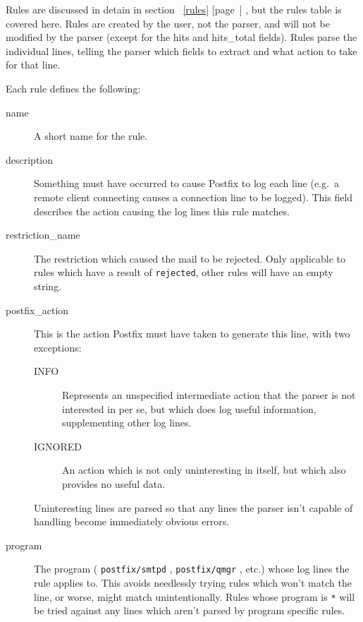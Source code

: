 \documentclass[a4paper,12pt,draft]{article}
\newcommand{\refwithpage}[1]{%
    \empty{}\ref{#1} [page~\pageref{#1}]%
}
\newcommand{\daemon}[1]{%
    \texttt{postfix/#1}%
}
\begin{document}
Rules are discussed in detain in section~\refwithpage{rules}, but the rules
table is covered here.  Rules are created by the user, not the parser, and
will not be modified by the parser (except for the hits and hits\_total
fields).  Rules parse the individual lines, telling the parser which fields
to extract and what action to take for that line.

Each rule defines the following:

\begin{description}

    \item [name] A short name for the rule.

    \item [description] Something must have occurred to cause Postfix to
        log each line (e.g.\ a remote client connecting causes a connection
        line to be logged).  This field describes the action causing the
        log lines this rule matches.

    \item [restriction\_name] The restriction which caused the mail to be
        rejected.  Only applicable to rules which have a result of
        \texttt{rejected}, other rules will have an empty string.

    \item [postfix\_action] This is the action Postfix must have taken to
        generate this line, with two exceptions:

        \begin{description}

            \item [INFO] Represents an unspecified intermediate action that
                the parser is not interested in per se, but which does log
                useful information, supplementing other log lines.

            \item [IGNORED] An action which is not only uninteresting in
                itself, but which also provides no useful data.

        \end{description}

        Uninteresting lines are parsed so that any lines the parser isn't
        capable of handling become immediately obvious errors.

    \item [program] The program (\daemon{smtpd}, \daemon{qmgr}, etc.) whose
        log lines the rule applies to.  This avoids needlessly trying rules
        which won't match the line, or worse, might match unintentionally.
        Rules whose program is \texttt{*} will be tried against any lines
        which aren't parsed by program specific rules.


\end{description}
\end{document}
